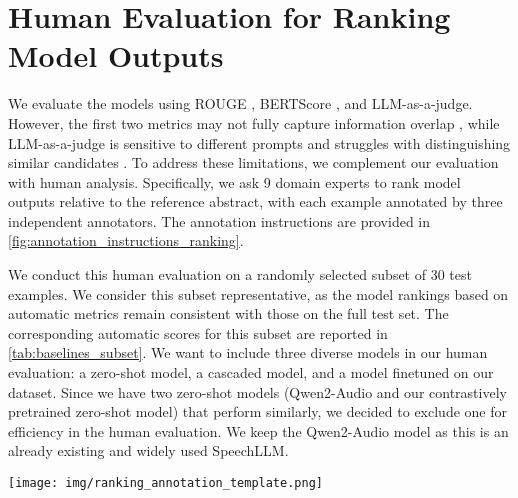 \section{Human Evaluation for Ranking Model Outputs}\label{app:human_eval_ranking_model_outputs}

We evaluate the models using ROUGE \citep{lin-2004-rouge}, BERTScore \citep{DBLP:conf/iclr/ZhangKWWA20}, and LLM-as-a-judge. However, the first two metrics may not fully capture information overlap \citep{deutsch-roth-2021-understanding}, while LLM-as-a-judge is sensitive to different prompts \citep{thakur2024judgingjudgesevaluatingalignment} and struggles with distinguishing similar candidates \citep{shen-etal-2023-large}. To address these limitations, we complement our evaluation with human analysis. Specifically, we ask 9 domain experts to rank model outputs relative to the reference abstract, with each example annotated by three independent annotators. The annotation instructions are provided in \cref{fig:annotation_instructions_ranking}.

We conduct this human evaluation on a randomly selected subset of 30 test examples. We consider this subset representative, as the model rankings based on automatic metrics remain consistent with those on the full test set. The corresponding automatic scores for this subset are reported in \cref{tab:baselines_subset}. We want to include three diverse models in our human evaluation: a zero-shot model, a cascaded model, and a model finetuned on our dataset. Since we have two zero-shot models (Qwen2-Audio and our contrastively pretrained zero-shot model) that perform similarly, we decided to exclude one for efficiency in the human evaluation. We keep the Qwen2-Audio model as this is an already existing and widely used SpeechLLM. 


\begin{figure*}
    \centering
    \texttt{[image: img/ranking\_annotation\_template.png]}
    \caption{Instructions for human annotators for ranking model outputs.}
    \label{fig:annotation_instructions_ranking}
\end{figure*}
